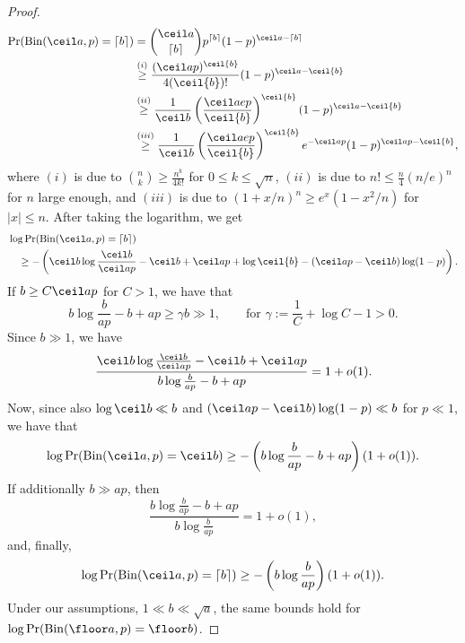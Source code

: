 \begin{proof}
    \begin{align*}
\Pr(\mathrm{Bin}(\ceil a, p) = \lceil b \rceil) &= {\ceil a \choose \lceil b \rceil} p^{\lceil b \rceil}(1 - p)^{\ceil a - \lceil b \rceil} \\
&\overset{(i)}{\geq} \frac{(\ceil a p)^{  \ceil{b}  }}{4 (  \ceil{b}  )!} (1 - p)^{\ceil a -   \ceil{b}  } \\
&\overset{(ii)}{\geq} \frac{1}{\ceil b} \left(\frac{\ceil a e p}{  \ceil{b}  } \right)^{  \ceil{b}  } (1 - p)^{\ceil a -   \ceil{b}  } \\
&\overset{(iii)}{\geq} \frac{1}{\ceil b} \left(\frac{\ceil a e p}{  \ceil{b}  } \right)^{  \ceil{b}  } e^{-\ceil a p} (1 - p)^{\ceil a p - \ceil{b} },
\end{align*}
where $(i)$ is due to ${n \choose k} \geq \frac{n^k}{4k!}$ for $0 \leq k \leq \sqrt{n}$, $(ii)$ is due to $n! \leq \frac{n}{4}(n/e)^n$ for $n$ large enough, and $(iii)$ is due to $(1 + x/n)^n \geq e^x (1 - x^2/n)$ for $|x|\leq n$.
After taking the logarithm, we get 
\begin{equation*}
    \begin{aligned}
    &\log \Pr(\mathrm{Bin}(\ceil a, p) = \lceil b \rceil) \\
    &\quad \geq - \left(\ceil b \log \frac{\ceil b}{\ceil a  p} - \ceil b + \ceil a p +  \log \ceil{b} - (\ceil a p - \ceil b) \log (1 - p) \right).
    \end{aligned}
\end{equation*}
If \(b \geq C \ceil a p\) for \(C > 1\), we have that 
\begin{equation*}
    b \log \frac{b}{ap} - b + ap \geq \gamma b \gg 1, \qquad \text{for } \gamma := \frac{1}{C} + \log C - 1 > 0.
\end{equation*}
Since \(b \gg 1\), we have
\begin{equation*}
\frac{\ceil b \log \frac{\ceil b}{\ceil a p} - \ceil b + \ceil a p}{ b \log \frac{b}{ap} - b + ap} = 1 + o(1).
\end{equation*}
Now, since also \(\log \ceil b \ll b\) and \((\ceil a p - \ceil b) \log (1 - p) \ll b\) for \(p \ll 1\), we have that
\begin{equation*}
    \log \Pr(\mathrm{Bin}(\ceil a, p) = \ceil b) \geq - \left(b \log \frac{b}{ap} - b + ap\right)(1 + o(1)).
\end{equation*}
If additionally \(b \gg ap\), then 
\begin{equation*}
    \frac{b \log \frac{b}{ap} - b + ap}{b \log \frac{b}{ap}} = 1 + o(1),
\end{equation*}
and, finally,
\begin{equation*}
    \log \Pr(\mathrm{Bin}(\ceil a, p) = \lceil b \rceil) \geq - \left(b \log \frac{b}{ap}\right)(1 + o(1)).
\end{equation*}
Under our assumptions, \(1 \ll b \ll \sqrt{a}\), the same bounds hold for \(\log \Pr(\mathrm{Bin}(\floor a, p) = \floor b)\).
\end{proof}

